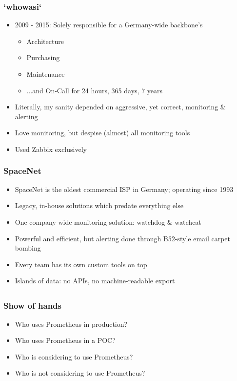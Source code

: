\documentclass[t]{beamer}
\begin{document}
\begin{frame}
	\frametitle{`whowasi`}
	\begin{itemize}
		\item 2009 - 2015: Solely responsible for a Germany-wide backbone's
		\begin{itemize}
			\item Architecture
			\item Purchasing
			\item Maintenance
			\item ...and On-Call for 24 hours, 365 days, 7 years
		\end{itemize}
		\item Literally, my sanity depended on aggressive, yet correct, monitoring \& alerting
		\item Love monitoring, but despise (almost) all monitoring tools
		\item Used Zabbix exclusively
	\end{itemize}
\end{frame}

\begin{frame}
	\frametitle{SpaceNet}
	\begin{itemize}
		\item SpaceNet is the oldest commercial ISP in Germany; operating since 1993
		\item Legacy, in-house solutions which predate everything else
		\item One company-wide monitoring solution: watchdog \& watchcat
		\item Powerful and efficient, but alerting done through B52-style email carpet bombing
		\item Every team has its own custom tools on top
		\item Islands of data: no APIs, no machine-readable export
	\end{itemize}
\end{frame}

\subsection{}




\begin{frame}
	\frametitle{Show of hands}
	\begin{itemize}
		\item Who uses Prometheus in production?
		\item Who uses Prometheus in a POC?
		\item Who is considering to use Prometheus?
		\item Who is not considering to use Prometheus?
	\end{itemize}
\end{frame}
\end{document}

